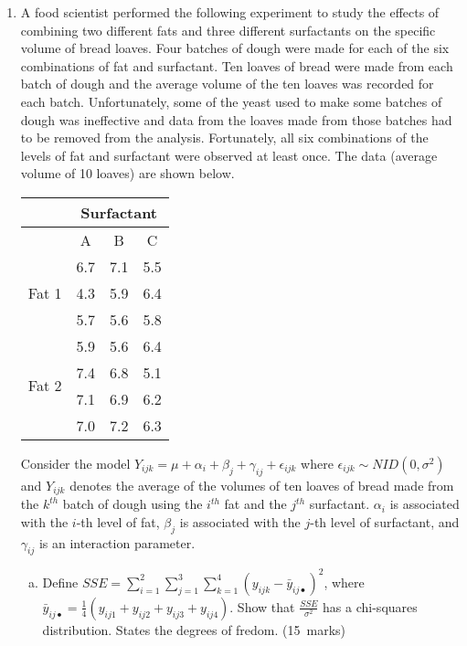 \documentclass[soln,12pt]{utarexam}
\begin{document}
\begin{enumerate}
  
\item \label{NT-Q18c}
A food scientist performed the following experiment to study 
    the effects of combining two different fats and three different 
    surfactants on the specific volume of bread loaves.
    Four batches of dough were made for each of the six combinations of
    fat and surfactant.
    Ten loaves of bread were made from each batch of dough and the average 
    volume of the ten loaves was recorded for each batch. Unfortunately, 
    some of the yeast used to make some batches of dough was ineffective 
    and data from the loaves made from those batches had to be removed 
    from the analysis. Fortunately, all six combinations of the levels 
    of fat and surfactant were observed at least once. The data
    (average volume of 10 loaves) are shown below.

    \begin{center}
      \begin{tabular}{|c|c|c|c|} \hline
        &\multicolumn{3}{|c|}{Surfactant}\\ \hline
        &A&B&C \\ \hline
        \multirow{3}{*}{Fat 1}&6.7&7.1&5.5 \\
        &4.3&5.9&6.4 \\
        &5.7&5.6&5.8 \\ \hline
        \multirow{4}{*}{Fat 2}&5.9&5.6&6.4 \\
        &7.4&6.8&5.1 \\
        &7.1&6.9&6.2 \\
        &7.0&7.2&6.3 \\ \hline       
      \end{tabular}
    \end{center}
    Consider the model 
    $Y_{ijk} = \mu + \alpha_i + \beta_j + \gamma_{ij} + \epsilon_{ijk}$
    where $\epsilon_{ijk} \sim NID(0, \sigma^2)$ and $Y_{ijk}$
    denotes the average of the volumes of ten loaves of bread made from 
    the $k^{th}$ batch of dough using the $i^{th}$ fat and the
    $j^{th}$ surfactant.  $\alpha_i$ is
       associated with the $i$-th level of fat, $\beta_j$ is
       associated with the $j$-th level of surfactant, and $\gamma_{ij}$
       is an interaction parameter.
\begin{enumerate}[(a)]
       \item Define $SSE = \sum_{i=1}^2 \sum_{j=1}^3
         \sum_{k=1}^4(y_{ijk} - \bar y_{ij\bullet})^2$, where $\bar y_{ij\bullet}
         = \frac14 (y_{ij1} + y_{ij2}+ y_{ij3}+ y_{ij4})$. Show that $\frac{SSE}{\sigma^2}$ has
         a chi-squares distribution. States the degrees of fredom. 
\hfill(15~marks)
         \begin{answer}~


\end{answer}
\end{enumerate}
\end{enumerate}
\end{document}
